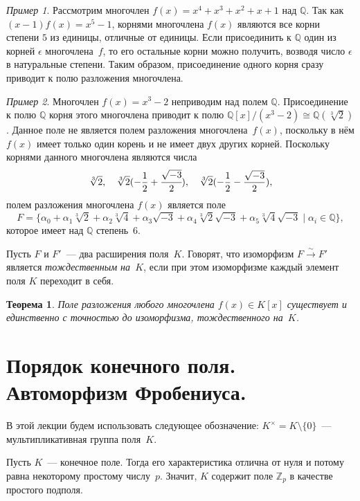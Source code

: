 \documentclass[a4paper, 12pt]{article}
\def\ZZ{{\mathbb Z}}%
\def\QQ{{\mathbb Q}}%
\newtheorem{theorem}{Теорема}
\theoremstyle{definition}
\theoremstyle{remark}
\newtheorem{example}{Пример}
\begin{document}
\begin{example}
Рассмотрим многочлен $f(x) = x^4+x^3+x^2+x+1$ над $\QQ$. Так как
$(x-1)f(x) = x^5-1$, корнями многочлена $f(x)$ являются все корни
степени $5$ из единицы, отличные от единицы. Если присоединить к
$\QQ$ один из корней $\epsilon$ многочлена~$f$, то его остальные
корни можно получить, возводя число $\epsilon$ в натуральные
степени. Таким образом, присоединение одного корня сразу приводит к
полю разложения многочлена.
\end{example}


\begin{example}
Многочлен $f(x)=x^3-2$ неприводим над полем $\QQ$. Присоединение к
полю $\QQ$ корня этого многочлена приводит к полю $\QQ[x]/(x^3-2)
\cong \QQ(\sqrt[3]{2})$. Данное поле не является полем разложения
многочлена~$f(x)$, поскольку в нём $f(x)$ имеет только один корень и
не имеет двух других корней. Поскольку корнями данного многочлена
являются числа
$$
\sqrt[3]{2}, \quad \sqrt[3]{2}(-\frac{1}{2} + \cfrac{\sqrt{-3}}{2}),
\quad \sqrt[3]{2}(-\frac{1}{2} - \frac{\sqrt{-3}}{2}),
$$
полем разложения многочлена $f(x)$ является поле
$$
F = \{\alpha_0 + \alpha_1 \sqrt[3]{2} + \alpha_2 \sqrt[3]{4} +
\alpha_3 \sqrt{-3} + \alpha_4 \sqrt[3]{2} \sqrt{-3} + \alpha_5
\sqrt[3]{4} \sqrt{-3} \mid \alpha_i \in \QQ\},
$$
которое имеет над $\QQ$ степень~$6$.
\end{example}

Пусть $F$ и $F'$~--- два расширения поля~$K$. Говорят, что
изоморфизм $F \xrightarrow{\sim} F'$ является \textit{тождественным
на~$K$}, если при этом изоморфизме каждый элемент поля $K$ переходит
в себя.

\begin{theorem}
Поле разложения любого многочлена $f(x) \in K[x]$ существует и
единственно с точностью до изоморфизма, тождественного на~$K$.
\end{theorem}

\section{Порядок конечного поля. Автоморфизм Фробениуса.}

В этой лекции будем использовать следующее обозначение: $K^\times =
K \setminus \lbrace 0 \rbrace$~--- мультипликативная группа
поля~$K$.

Пусть $K$~--- конечное поле. Тогда его характеристика отлична от
нуля и потому равна некоторому простому числу~$p$. Значит, $K$
содержит поле $\ZZ_p$ в качестве простого подполя.
\end{document}
